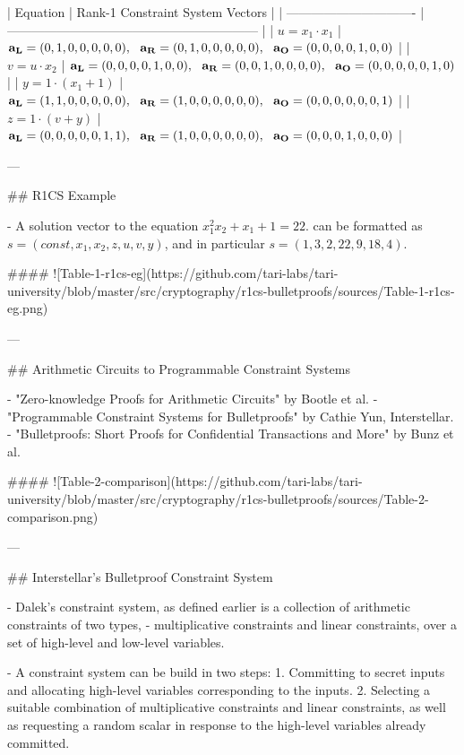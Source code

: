 | Equation                        | Rank-1 Constraint System Vectors                             |
| ------------------------------- | ------------------------------------------------------------ |
| ${ u = x_1\cdot x_1}$          | $ {\bf{a_L}} = ( 0 , 1 , 0 , 0 , 0 , 0 , 0 ) , \ \ {\bf{a_R}} = ( 0 , 1 , 0 , 0 , 0 , 0 , 0  ) ,\ \ {\bf{a_O}} = ( 0 , 0 , 0 , 0 , 1 , 0 , 0  ) $ |
| $ { v = u\cdot x_2 }$          | $ {\bf{a_L}} = ( 0 , 0 , 0 , 0 , 1 , 0 , 0 ) ,\ \ {\bf{a_R}} = ( 0 , 0 , 1 , 0 , 0 , 0 , 0  ),\ \ {\bf{a_O}} = ( 0 , 0 , 0 , 0 , 0 , 1 , 0 )  $ |
| $ { y = 1\cdot( x_1 + 1 ) } $ | ${\bf{a_L}} = ( 1 , 1 , 0 , 0 , 0 , 0 , 0 ),\ \ {\bf{a_R}} = ( 1 , 0 , 0 , 0 , 0 , 0 , 0 ),\ \ {\bf{a_O}} = ( 0 , 0 , 0 , 0 , 0 , 0 , 1 ) $ |
| $ { z = 1\cdot( v + y )} $    | ${\bf{a_L}} = ( 0 , 0 , 0 , 0 , 0 , 1 , 1 ),\ \ {\bf{a_R}} = ( 1 , 0 , 0 , 0 , 0 , 0 , 0 ),\ \ {\bf{a_O}} = ( 0 , 0 , 0 , 1 , 0 , 0 , 0 )$ |


--- 

## R1CS Example

- A solution vector to the equation ${x^2_1 x_2 + x_1 + 1 = 22}$. can be formatted as 
${ { s = ( const , x_1 , x_2 , z , u , v , y )}}$, and in particular  ${ { s = ( 1 , 3 , 2 , 22 , 9 , 18 , 4 )}}$. 


#### ![Table-1-r1cs-eg](https://github.com/tari-labs/tari-university/blob/master/src/cryptography/r1cs-bulletproofs/sources/Table-1-r1cs-eg.png)


--- 

## Arithmetic Circuits to Programmable Constraint Systems


- "Zero-knowledge Proofs for Arithmetic Circuits" by Bootle et al. 
- "Programmable Constraint Systems for Bulletproofs" by Cathie Yun, Interstellar. 
- "Bulletproofs: Short Proofs for Confidential Transactions and More" by Bunz et al. 

#### ![Table-2-comparison](https://github.com/tari-labs/tari-university/blob/master/src/cryptography/r1cs-bulletproofs/sources/Table-2-comparison.png)

--- 

## Interstellar's Bulletproof Constraint System 

- Dalek's constraint system, as defined earlier is 
a collection of arithmetic constraints of two types, 
   - multiplicative constraints and linear constraints, over a set of 
high-level and low-level variables.


- A constraint system can be build in two steps: 
      1. Committing to secret inputs and allocating high-level variables corresponding to the inputs.
      2. Selecting a suitable combination of multiplicative constraints and linear constraints, as well as requesting a random 
   scalar in response to the high-level variables already committed.  

